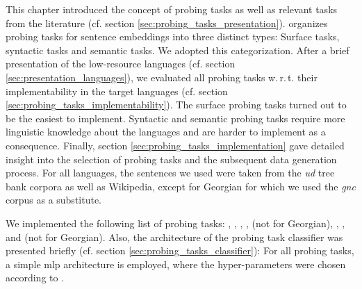 This chapter introduced the concept of probing tasks as well as relevant tasks from the literature (cf. section \vref{sec:probing_tasks_presentation}). \citep{Conneau.2018a} organizes probing tasks for sentence embeddings into three distinct types: Surface tasks, syntactic tasks and semantic tasks. We adopted this categorization. After a brief presentation of the low-resource languages (cf. section \vref{sec:presentation_languages}), we evaluated all probing tasks w.\,r.\,t. their implementability in the target languages (cf. section \vref{sec:probing_tasks_implementability}). The surface probing tasks turned out to be the easiest to implement. Syntactic and semantic probing tasks require more linguistic knowledge about the languages and are harder to implement as a consequence. Finally, section \vref{sec:probing_tasks_implementation} gave detailed insight into the selection of probing tasks and the subsequent data generation process. For all languages, the sentences we used were taken from the \textit{\gls{ud}} tree bank corpora as well as Wikipedia, except for Georgian for which we used the \textit{\gls{gnc}} corpus as a substitute.

We implemented the following list of probing tasks: , , , ,  (not for Georgian), , ,  and  (not for Georgian). Also, the architecture of the probing task classifier was presented briefly (cf. section \vref{sec:probing_tasks_classifier}): For all probing tasks, a simple \gls{mlp} architecture is employed, where the hyper-parameters were chosen according to \citep{Perone.2018}.